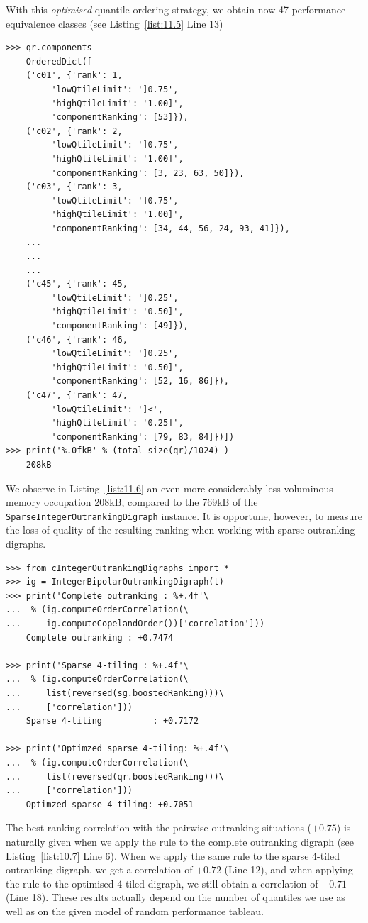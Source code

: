 With this \emph{optimised} quantile ordering strategy, we obtain now 47 performance equivalence classes (see Listing~\vref{list:11.5} Line 13)
\begin{lstlisting}[caption={The ordered components of the sparse outranking digraph},label=list:11.6]
>>> qr.components
    OrderedDict([
    ('c01', {'rank': 1,
	     'lowQtileLimit': ']0.75',
	     'highQtileLimit': '1.00]',
	     'componentRanking': [53]}),
    ('c02', {'rank': 2,
	     'lowQtileLimit': ']0.75',
	     'highQtileLimit': '1.00]',
	     'componentRanking': [3, 23, 63, 50]}),
    ('c03', {'rank': 3,
	     'lowQtileLimit': ']0.75',
	     'highQtileLimit': '1.00]',
	     'componentRanking': [34, 44, 56, 24, 93, 41]}), 
    ...
    ...
    ...
    ('c45', {'rank': 45,
	     'lowQtileLimit': ']0.25',
	     'highQtileLimit': '0.50]',
	     'componentRanking': [49]}),
    ('c46', {'rank': 46,
	     'lowQtileLimit': ']0.25',
	     'highQtileLimit': '0.50]',
	     'componentRanking': [52, 16, 86]}),
    ('c47', {'rank': 47,
	     'lowQtileLimit': ']<',
	     'highQtileLimit': '0.25]',
	     'componentRanking': [79, 83, 84]})])
>>> print('%.0fkB' % (total_size(qr)/1024) )
    208kB
\end{lstlisting}

We observe in Listing~\vref{list:11.6} an even more considerably less voluminous memory occupation 208kB, compared to the 769kB of the \texttt{SparseIntegerOutran\-king\-Digraph} instance. It is opportune, however, to measure the loss of quality of the resulting \Copeland ranking when working with sparse outranking digraphs.
\begin{lstlisting}[caption={Measuring the loss of quality with respect to the standard outranking digraph},label=list:11.7]
>>> from cIntegerOutrankingDigraphs import *
>>> ig = IntegerBipolarOutrankingDigraph(t)
>>> print('Complete outranking : %+.4f'\
...  % (ig.computeOrderCorrelation(\
...     ig.computeCopelandOrder())['correlation']))
    Complete outranking : +0.7474

>>> print('Sparse 4-tiling : %+.4f'\
...  % (ig.computeOrderCorrelation(\
...     list(reversed(sg.boostedRanking)))\
...     ['correlation']))   
    Sparse 4-tiling          : +0.7172

>>> print('Optimzed sparse 4-tiling: %+.4f'\
...  % (ig.computeOrderCorrelation(\
...     list(reversed(qr.boostedRanking)))\
...     ['correlation']))  
    Optimzed sparse 4-tiling: +0.7051
\end{lstlisting}

The best ranking correlation with the pairwise outranking situations ($+0.75$) is naturally given when we apply the \Copeland rule to the complete outranking digraph (see Listing~\vref{list:10.7} Line 6). When we apply the same rule to the sparse 4-tiled outranking digraph, we get a correlation of $+0.72$ (Line 12), and when applying the \Copeland rule to the optimised 4-tiled digraph, we still obtain a correlation of $+0.71$ (Line 18). These results actually depend on the number of quantiles we use as well as on the given model of random performance tableau.

